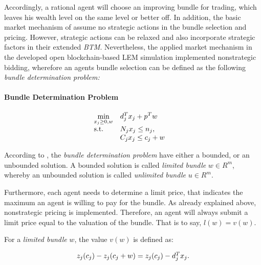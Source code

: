 Accordingly, a rational agent will choose an improving bundle for trading, 
which leaves his wealth level on the same level or better off. 
In addition, the basic market mechanism of  assume no 
strategic actions in the bundle selection and pricing. However, strategic actions 
can be relaxed and  also incorporate strategic factors
in their extended \textit{BTM}. 
Nevertheless, the applied market mechanism in the developed open blockchain-based
LEM simulation implemented nonstrategic bidding, wherefore an agents bundle selection 
can be defined as the following \textit{bundle determination problem:}

\paragraph*{Bundle Determination Problem}
\begin{equation}
    \begin{array}{ll@{}ll}
        \underset{x_{j} \geq 0, w}{\text{min}}  & \displaystyle d^{T}_{j}x_{j} + p^{T}w &\\
        \text{s.t.}& \displaystyle N_{j}x_{j} \leq n_{j}, &&\\
                    & \displaystyle C_{j}x_{j} \leq c_{j}+w
    \end{array}
\end{equation}

According to , the \textit{bundle determination problem} have either 
a bounded, or an unbounded solution. A bounded solution is called \textit{limited bundle} 
$w \in R^{m}$, whereby an unbounded solution is called \textit{unlimited bundle}
$u \in R^{m}$.

Furthermore, each agent needs to determine a limit price, that indicates
the maximum an agent is willing to pay for the bundle. 
As already explained above, nonstrategic pricing is implemented. 
Therefore, an agent will always submit a limit price equal to the valuation of the 
bundle. That is to say, $l(w) = v(w)$.

For a \textit{limited bundle} $w$, the value $v(w)$ is defined as:

\begin{equation*}
    \begin{array}{ll@{}ll}
        z_{j}(c_{j}) - z_{j}(c_{j} + w) = z_{j}(c_{j}) - d_{j}^{T}x_{j}.
    \end{array}
\end{equation*}

